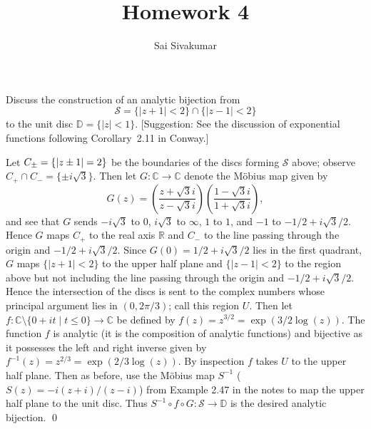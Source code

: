 \documentclass[12pt]{amsart}
\title{Homework 4}
\author{Sai Sivakumar}
\newcommand{\DD}{\mathbb{D}}
\newcommand{\cS}{\mathcal{S}}
\begin{document}
\maketitle

\thispagestyle{empty}
 
Discuss the construction of an analytic bijection
 from  
\[
 \cS=\{|z+1|<2\}\cap \{|z-1|<2\}
\]
 to the unit disc $\DD=\{|z|<1\}.$ [Suggestion: See the discussion 
  of exponential functions following Corollary~2.11 in Conway.]

\bigskip

\baselineskip=24pt
Let $C_\pm = \{\abs{z\pm 1} = 2\}$ be the boundaries of the discs forming $\mathcal{S}$ above; observe $C_+\cap C_- = \{\pm i\sqrt{3}\}$. Then let $G\colon \mathbb{C}\to\mathbb{C}$ denote the M\"obius map given by \[G(z) = \left(\frac{z+\sqrt{3}i}{z-\sqrt{3}i}\right)\left(\frac{1-\sqrt{3}i}{1+\sqrt{3}i}\right),\] and see that $G$ sends $-i\sqrt{3}$ to $0$, $i\sqrt{3}$ to $\infty$, $1$ to $1$, and $-1$ to $-1/2 + i\sqrt{3}/2$. Hence $G$ maps $C_+$ to the real axis $\mathbb{R}$ and $C_-$ to the line passing through the origin and $-1/2 + i\sqrt{3}/2$. Since $G(0) = 1/2 + i\sqrt{3}/2$ lies in the first quadrant, $G$ maps $\{|z+1|<2\}$ to the upper half plane and $\{|z-1|<2\}$ to the region above but not including the line passing through the origin and $-1/2 + i\sqrt{3}/2$. Hence the intersection of the discs is sent to the complex numbers whose principal argument lies in $(0,2\pi/3)$; call this region $U$. Then let $f\colon \mathbb{C}\setminus\{0+it\mid t\leq 0\}\to \mathbb{C}$ be defined by $f(z) = z^{3/2} = \exp(3/2\log(z))$. The function $f$ is analytic (it is the composition of analytic functions) and bijective as it possesses the left and right inverse given by $f^{-1}(z) = z^{2/3} = \exp(2/3\log(z))$. By inspection $f$ takes $U$ to the upper half plane. Then as before, use the M\"obius map $S^{-1}$ ($S(z) = -i(z+i)/(z-i)$) from Example 2.47 in the notes to map the upper half plane to the unit disc. Thus $S^{-1}\circ f\circ G\colon \mathcal{S}\to \mathbb{D}$ is the desired analytic bijection. 
\qed %
\end{document}
